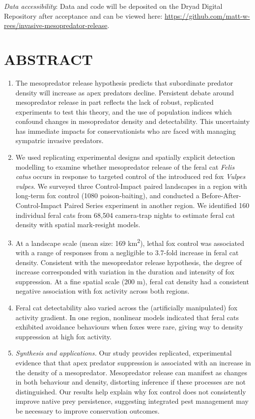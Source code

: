\documentclass[]{elsarticle} %
\begin{document}
\emph{Data accessibility}: Data and code will be deposited on the Dryad Digital Repository after acceptance and can be viewed here: \url{https://github.com/matt-w-rees/invasive-mesopredator-release}.

\newpage

\linenumbers

\hypertarget{abstract}{%
\section*{ABSTRACT}\label{abstract}}

\begin{enumerate}
\def\labelenumi{\arabic{enumi}.}
\item
  The mesopredator release hypothesis predicts that subordinate predator density will increase as apex predators decline. Persistent debate around mesopredator release in part reflects the lack of robust, replicated experiments to test this theory, and the use of population indices which confound changes in mesopredator density and detectability. This uncertainty has immediate impacts for conservationists who are faced with managing sympatric invasive predators.
\item
  We used replicating experimental designs and spatially explicit detection modelling to examine whether mesopredator release of the feral cat \emph{Felis catus} occurs in response to targeted control of the introduced red fox \emph{Vulpes vulpes}. We surveyed three Control-Impact paired landscapes in a region with long-term fox control (1080 poison-baiting), and conducted a Before-After-Control-Impact Paired Series experiment in another region. We identified 160 individual feral cats from 68,504 camera-trap nights to estimate feral cat density with spatial mark-resight models.
\item
  At a landscape scale (mean size: 169 km\textsuperscript{2}), lethal fox control was associated with a range of responses from a negligible to 3.7-fold increase in feral cat density. Consistent with the mesopredator release hypothesis, the degree of increase corresponded with variation in the duration and intensity of fox suppression. At a fine spatial scale (200 m), feral cat density had a consistent negative association with fox activity across both regions.
\item
  Feral cat detectability also varied across the (artificially manipulated) fox activity gradient. In one region, nonlinear models indicated that feral cats exhibited avoidance behaviours when foxes were rare, giving way to density suppression at high fox activity.
\item
  \emph{Synthesis and applications.} Our study provides replicated, experimental evidence that that apex predator suppression is associated with an increase in the density of a mesopredator. Mesopredator release can manifest as changes in both behaviour and density, distorting inference if these processes are not distinguished. Our results help explain why fox control does not consistently improve native prey persistence, suggesting integrated pest management may be necessary to improve conservation outcomes.
\end{enumerate}
\end{document}
